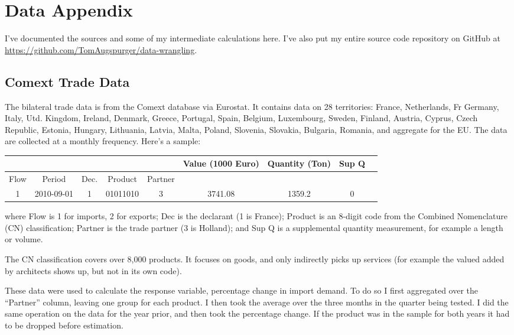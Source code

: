 \documentclass[11pt]{article}
\begin{document}
\section{Data Appendix}
\label{sec:data_appendix}
  I've documented the sources and some of my intermediate calculations here.  I've also put my entire source code repository on GitHub at \href{https://github.com/TomAugspurger/data-wrangling}{https://github.com/TomAugspurger/data-wrangling}.
\subsection{Comext Trade Data}
\label{sub:comext_trade_data}
  The bilateral trade data is from the Comext database via Eurostat.  It contains data on 28 territories: France, Netherlands, Fr Germany, Italy, Utd. Kingdom, Ireland, Denmark, Greece, Portugal, Spain, Belgium, Luxembourg, Sweden, Finland, Austria, Cyprus, Czech Republic, Estonia, Hungary, Lithuania, Latvia, Malta, Poland, Slovenia, Slovakia, Bulgaria, Romania, and aggregate for the EU.  The data are collected at a monthly frequency.  Here's a sample:

  \begin{table}[h]
  \begin{tabular}{|c|c|c|c|c|c|c|c|c|}\footnotesize
    & & & & & Value (1000 Euro) & Quantity (Ton) & Sup Q \\ \hline
    Flow & Period & Dec. & Product & Partner &  &  &     \\ \hline
    1 & 2010-09-01 & 1  & 01011010 & 3       & 3741.08 & 1359.2 & 0\\ \hline
  \end{tabular}
  \end{table}

  where Flow is 1 for imports, 2 for exports; Dec is the declarant (1 is France); Product is an 8-digit code from the Combined Nomenclature (CN) classification; Partner is the trade partner (3 is Holland); and Sup Q is a supplemental quantity measurement, for example a length or volume.

  The CN classification covers over 8,000 products.  It focuses on goods, and only indirectly picks up services (for example the valued added by architects shows up, but not in its own code).

  These data were used to calculate the response variable, percentage change in import demand.  To do so I first aggregated over the ``Partner'' column, leaving one group for each product.  I then took the average over the three months in the quarter being tested.  I did the same operation on the data for the year prior, and then took the percentage change.  If the product was in the sample for both years it had to be dropped before estimation.
\end{document}
